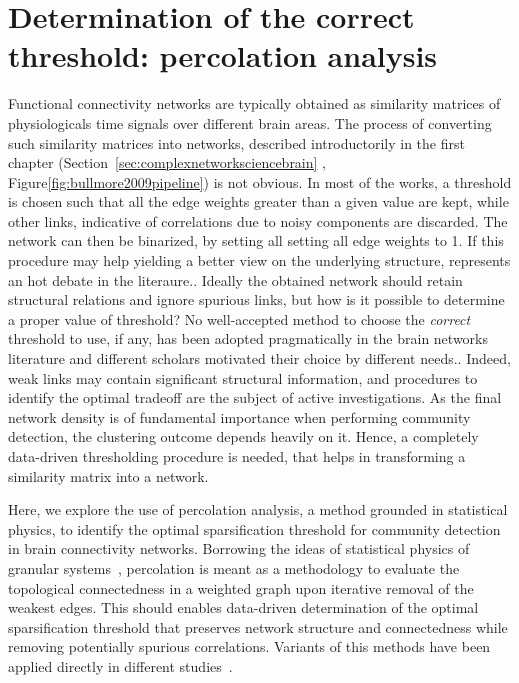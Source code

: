 \section{Determination of the correct threshold: percolation analysis}
Functional connectivity networks are typically obtained as similarity matrices of physiologicals time signals over different brain areas. The process of converting such similarity matrices into networks, described introductorily in the first chapter (Section~\ref{sec:complexnetworksciencebrain} , Figure\ref{fig:bullmore2009pipeline}) is not obvious. In most of the works, a threshold is chosen such that all the edge weights greater than a given value are kept, while other links, indicative of correlations due to noisy components are discarded. The network can then be binarized, by setting all setting all edge weights to 1. If this procedure may help yielding a better view on the underlying structure, represents an hot debate in the literaure..
Ideally the obtained network should retain structural relations and ignore spurious links, but how is it possible to determine a proper value of threshold?
No well-accepted method to choose the \emph{correct} threshold to use, if any, has been adopted pragmatically in the brain networks literature and different scholars motivated their choice by different needs..
Indeed, weak links may contain significant structural information, and procedures to identify the optimal tradeoff are the subject of active investigations.
As the final network density is of fundamental importance when performing community detection, the clustering outcome depends heavily on it.
Hence, a completely data-driven thresholding procedure is needed, that helps in transforming a similarity matrix into a network. 

Here, we explore the use of percolation analysis, a method grounded in statistical physics, to identify the optimal sparsification threshold for community detection in brain connectivity networks.
Borrowing the ideas of statistical physics of granular systems~, percolation is meant as a methodology to evaluate the topological connectedness in a weighted graph upon iterative removal of the weakest edges. This should enables data-driven determination of the optimal sparsification threshold that preserves network structure and connectedness while removing potentially spurious correlations.
Variants of this methods have been applied directly in different studies~\cite{gallos2012,bardella2016a,alexander-bloch2010}. 

